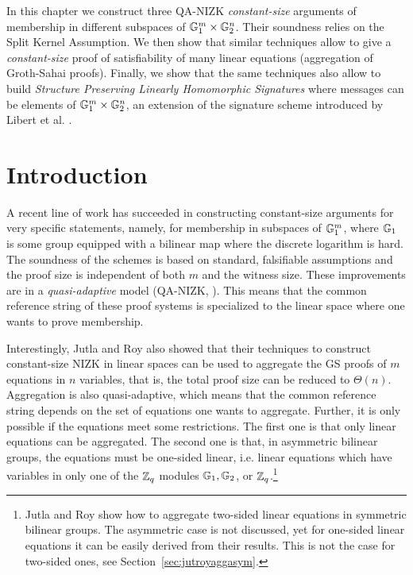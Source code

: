 
In this chapter we construct three QA-NIZK \emph{constant-size} arguments of membership in different subspaces of $\mathbb{G}^{m}_1 \times \mathbb{G}^{n}_2$. Their soundness relies on the Split Kernel Assumption. We then show that similar techniques allow to give a \emph{constant-size} proof of satisfiability of many linear equations (aggregation of Groth-Sahai proofs). Finally, we show that the same techniques also allow to build \emph{Structure Preserving Linearly Homomorphic Signatures} where messages can be elements of $\mathbb{G}_1^m\times\mathbb{G}_2^n$, an extension of the signature scheme introduced by Libert et al. \cite{C:LPJY13}. 
\section{Introduction}
A recent line of work 
  \cite{AC:JutRoy13,C:JutRoy14,EC:KilWee15,EC:LPJY14} 
has succeeded in constructing constant-size  
  arguments for very specific statements, namely, for membership in subspaces of $\mathbb{G}_1^{m}$, 
  where $\mathbb{G}_1$ is some group equipped with a bilinear map where the discrete logarithm is hard. 
The soundness of the schemes is based on standard, falsifiable assumptions 
  and the proof size is independent of both $m$ and the witness size.  These improvements are in a  \textit{quasi-adaptive} 
  model (QA-NIZK, \cite{AC:JutRoy13}).  This means that the common reference string of these proof systems is 
  specialized to the linear space where one wants to prove membership.
  
Interestingly, Jutla and Roy  \cite{C:JutRoy14} also showed that their techniques to construct 
  constant-size NIZK in linear spaces can be used to aggregate the GS proofs of $m$ equations in $n$ variables, that is,  the total proof size can be reduced to $\Theta(n)$.  Aggregation is also quasi-adaptive, 
which means that the common reference string depends on the set of equations one wants to aggregate.   Further, it is only possible if the equations meet some restrictions. The first one is that only linear equations can be aggregated. The second one is that, in asymmetric bilinear groups, the equations must be one-sided linear, i.e. linear equations 
  which have variables in only one of the $\mathbb{Z}_q$ modules $\mathbb{G}_1,\mathbb{G}_2$, 
  or $\mathbb{Z}_q$.\footnote{Jutla and Roy show how to aggregate two-sided linear equations in
  symmetric bilinear groups. The asymmetric case is not discussed, 
  yet for one-sided linear equations it can be easily  derived from
  their results. 
  This is not the case for two-sided ones, see Section~\ref{sec:jutroyaggasym}.} 


